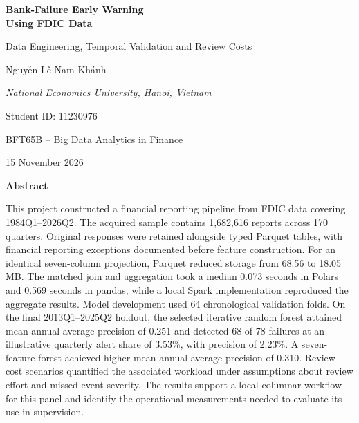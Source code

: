 \documentclass[11pt,a4paper]{article}
\begin{document}
\begin{titlepage}
\centering
\vspace*{7mm}
{\fontsize{18}{22}\selectfont\bfseries Bank-Failure Early Warning\\Using FDIC Data\par}
\vspace{3mm}
{\normalsize Data Engineering, Temporal Validation and Review Costs\par}
\vspace{7mm}
{\selectfont\large Nguyễn Lê Nam Khánh\par}
\vspace{2mm}
{\normalsize\itshape National Economics University, Hanoi, Vietnam\par}
\vspace{3mm}
{\normalsize Student ID: 11230976\par}
{\small BFT65B -- Big Data Analytics in Finance\par}
{\normalsize 15 November 2026\par}
\vspace{6mm}
{\bfseries Abstract\par}
\vspace{2mm}
\begin{minipage}{.92\textwidth}
\small{}\setlength{\parindent}{0pt}
This project constructed a financial reporting pipeline from FDIC data covering 1984Q1--2026Q2. The acquired sample contains 1,682,616 reports across 170 quarters. Original responses were retained alongside typed Parquet tables, with financial reporting exceptions documented before feature construction. For an identical seven-column projection, Parquet reduced storage from 68.56 to 18.05 MB. The matched join and aggregation took a median 0.073 seconds in Polars and 0.569 seconds in pandas, while a local Spark implementation reproduced the aggregate results. Model development used 64 chronological validation folds. On the final 2013Q1--2025Q2 holdout, the selected iterative random forest attained mean annual average precision of 0.251 and detected 68 of 78 failures at an illustrative quarterly alert share of 3.53\%, with precision of 2.23\%. A seven-feature forest achieved higher mean annual average precision of 0.310. Review-cost scenarios quantified the associated workload under assumptions about review effort and missed-event severity. The results support a local columnar workflow for this panel and identify the operational measurements needed to evaluate its use in supervision.

\end{minipage}
\end{titlepage}
\end{document}
